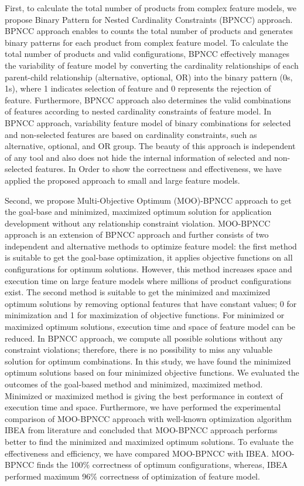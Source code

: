 First, to calculate the total number of products from complex feature models, we propose Binary Pattern for Nested Cardinality Constraints (BPNCC) approach. BPNCC approach enables to counts the total number of products and generates binary patterns for each product from complex feature model. To calculate the total number of products and valid configurations, BPNCC effectively manages the variability of feature model by converting the cardinality relationships of each parent-child relationship (alternative, optional, OR) into the binary pattern (0s, 1s), where 1 indicates selection of feature and 0 represents the rejection of feature. Furthermore, BPNCC approach also determines the valid combinations of features according to nested cardinality constraints of feature model. In BPNCC approach, variability feature model of binary combinations for selected and non-selected features are based on cardinality constraints, such as alternative, optional, and OR group. The beauty of this approach is independent of any tool and also does not hide the internal information of selected and non-selected features. In Order to show the correctness and effectiveness, we have applied the proposed approach to small and large feature models.

Second, we propose Multi-Objective Optimum (MOO)-BPNCC approach to get the goal-base and minimized, maximized optimum solution for application development without any relationship constraint violation. MOO-BPNCC approach is an extension of BPNCC approach and further consists of two independent and alternative methods to optimize feature model: the first method is suitable to get the goal-base optimization, it applies objective functions on all configurations for optimum solutions. However, this method increases space and execution time on large feature models where millions of product configurations exist. The second method is suitable to get the minimized and maximized optimum solutions by removing optional features that have constant values;  0 for minimization and 1 for maximization of objective functions. For minimized or maximized optimum solutions, execution time and space of feature model can be reduced. In BPNCC approach, we compute all possible solutions without any constraint violations; therefore, there is no possibility to miss any valuable solution for optimum combinations. In this study, we have found the minimized optimum solutions based on four minimized objective functions. We evaluated the outcomes of the goal-based method and minimized, maximized method. Minimized or maximized method is giving the best performance in context of execution time and space. Furthermore, we have performed the experimental comparison of MOO-BPNCC approach with well-known optimization algorithm IBEA from literature and concluded that MOO-BPNCC approach performs better to find the minimized and maximized optimum solutions. To evaluate the effectiveness and efficiency, we have compared MOO-BPNCC with IBEA. MOO-BPNCC finds the 100\% correctness of optimum configurations, whereas, IBEA performed maximum 96\% correctness of optimization of feature model.

